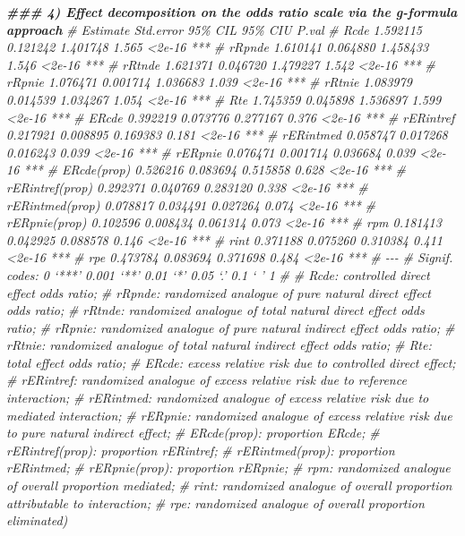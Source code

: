 \documentclass[
]{book}
\newenvironment{Shaded}{\begin{snugshade}}{\end{snugshade}}
\newcommand{\CommentTok}[1]{\textcolor[rgb]{0.56,0.35,0.01}{\textit{#1}}}
\newcommand{\DocumentationTok}[1]{\textcolor[rgb]{0.56,0.35,0.01}{\textbf{\textit{#1}}}}
\begin{document}
\begin{Shaded}
\begin{Highlighting}[]
\DocumentationTok{\#\#\# 4) Effect decomposition on the odds ratio scale via the g{-}formula approach}
\CommentTok{\#                 Estimate Std.error  95\% CIL 95\% CIU  P.val    }
\CommentTok{\# Rcde            1.592115  0.121242 1.401748   1.565 \textless{}2e{-}16 ***}
\CommentTok{\# rRpnde          1.610141  0.064880 1.458433   1.546 \textless{}2e{-}16 ***}
\CommentTok{\# rRtnde          1.621371  0.046720 1.479227   1.542 \textless{}2e{-}16 ***}
\CommentTok{\# rRpnie          1.076471  0.001714 1.036683   1.039 \textless{}2e{-}16 ***}
\CommentTok{\# rRtnie          1.083979  0.014539 1.034267   1.054 \textless{}2e{-}16 ***}
\CommentTok{\# Rte             1.745359  0.045898 1.536897   1.599 \textless{}2e{-}16 ***}
\CommentTok{\# ERcde           0.392219  0.073776 0.277167   0.376 \textless{}2e{-}16 ***}
\CommentTok{\# rERintref       0.217921  0.008895 0.169383   0.181 \textless{}2e{-}16 ***}
\CommentTok{\# rERintmed       0.058747  0.017268 0.016243   0.039 \textless{}2e{-}16 ***}
\CommentTok{\# rERpnie         0.076471  0.001714 0.036684   0.039 \textless{}2e{-}16 ***}
\CommentTok{\# ERcde(prop)     0.526216  0.083694 0.515858   0.628 \textless{}2e{-}16 ***}
\CommentTok{\# rERintref(prop) 0.292371  0.040769 0.283120   0.338 \textless{}2e{-}16 ***}
\CommentTok{\# rERintmed(prop) 0.078817  0.034491 0.027264   0.074 \textless{}2e{-}16 ***}
\CommentTok{\# rERpnie(prop)   0.102596  0.008434 0.061314   0.073 \textless{}2e{-}16 ***}
\CommentTok{\# rpm             0.181413  0.042925 0.088578   0.146 \textless{}2e{-}16 ***}
\CommentTok{\# rint            0.371188  0.075260 0.310384   0.411 \textless{}2e{-}16 ***}
\CommentTok{\# rpe             0.473784  0.083694 0.371698   0.484 \textless{}2e{-}16 ***}
\CommentTok{\# {-}{-}{-}}
\CommentTok{\# Signif. codes:  0 ‘***’ 0.001 ‘**’ 0.01 ‘*’ 0.05 ‘.’ 0.1 ‘ ’ 1}
\CommentTok{\# }
\CommentTok{\# Rcde: controlled direct effect odds ratio; }
\CommentTok{\# rRpnde: randomized analogue of pure natural direct effect odds ratio; }
\CommentTok{\# rRtnde: randomized analogue of total natural direct effect odds ratio; }
\CommentTok{\# rRpnie: randomized analogue of pure natural indirect effect odds ratio; }
\CommentTok{\# rRtnie: randomized analogue of total natural indirect effect odds ratio; }
\CommentTok{\# Rte: total effect odds ratio; }
\CommentTok{\# ERcde: excess relative risk due to controlled direct effect; }
\CommentTok{\# rERintref: randomized analogue of excess relative risk due to reference interaction; }
\CommentTok{\# rERintmed: randomized analogue of excess relative risk due to mediated interaction; }
\CommentTok{\# rERpnie: randomized analogue of excess relative risk due to pure natural indirect effect; }
\CommentTok{\# ERcde(prop): proportion ERcde; }
\CommentTok{\# rERintref(prop): proportion rERintref; }
\CommentTok{\# rERintmed(prop): proportion rERintmed; }
\CommentTok{\# rERpnie(prop): proportion rERpnie; }
\CommentTok{\# rpm: randomized analogue of overall proportion mediated; }
\CommentTok{\# rint: randomized analogue of overall proportion attributable to interaction; }
\CommentTok{\# rpe: randomized analogue of overall proportion eliminated)}
\end{Highlighting}
\end{Shaded}
\end{document}

